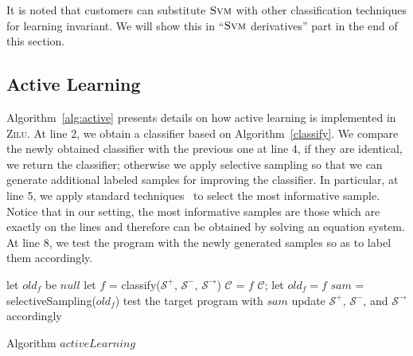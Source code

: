 It is noted that customers can substitute $\textsc{Svm}$ with other classification techniques for learning invariant. 
We will show this in ``$\textsc{Svm}$ derivatives'' part in the end of this section.
 



\subsection{Active Learning} 
Algorithm~\ref{alg:active} presents details on how active learning is implemented in \textsc{Zilu}. 
At line 2, we obtain a classifier based on Algorithm~\ref{classify}. 
We compare the newly obtained classifier with the previous one at line 4, if they are identical, we return the classifier; 
otherwise we apply selective sampling so that we can generate additional labeled samples for improving the classifier. 
In particular, at line 5, we apply standard techniques~\cite{DBLP:conf/icml/SchohnC00} to select the most informative sample. 
Notice that in our setting, the most informative samples are those which are exactly on the lines and therefore can be obtained by solving an equation system. 
At line 8, we test the program with the newly generated samples so as to label them accordingly.
\begin{algorithm}[h]
\SetAlgoVlined
\Indm
{}
\Indp
let $old_f$ be $null$\;
 {
    let $f$ = classify($\mathcal{S}^+$, $\mathcal{S}^-$, $\mathcal{S}^\rightarrow$)\;
     {
         {
            $\mathcal{C}$ = $f$\;
            \Return $\mathcal{C}$;
        }
        let $old_f = f$\;
    }
    $sam$ = selectiveSampling($old_f$)\;
    test the target program with $sam$\;
    update $\mathcal{S}^+$, $\mathcal{S}^-$, and $\mathcal{S}^\rightarrow$ accordingly\;
}
\caption{Algorithm $activeLearning$}
\label{alg:active}
\end{algorithm}


